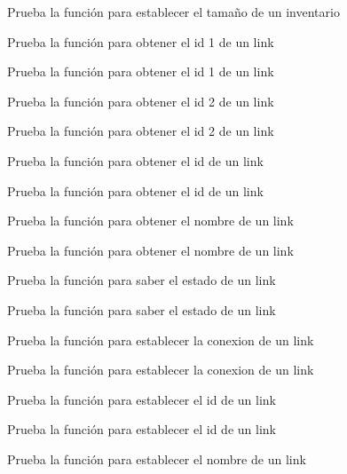 \begin{DoxyRefList}
Prueba la función para establecer el tamaño de un inventario  
\item[\label{test__test000199}%
\Hypertarget{test__test000199}%
Member \hyperlink{link__test_8h_a79d95fe7b7d20331545c527a26b18a62}{test2\+\_\+link\+\_\+get\+\_\+conection\+\_\+1} ()]Prueba la función para obtener el id 1 de un link 

Prueba la función para obtener el id 1 de un link  
\item[\label{test__test000201}%
\Hypertarget{test__test000201}%
Member \hyperlink{link__test_8h_a0a102f4a6a5fcc2026a75fb6675241d0}{test2\+\_\+link\+\_\+get\+\_\+conection\+\_\+2} ()]Prueba la función para obtener el id 2 de un link 

Prueba la función para obtener el id 2 de un link  
\item[\label{test__test000197}%
\Hypertarget{test__test000197}%
Member \hyperlink{link__test_8h_a0f967a1782dd7264e73ad428d22d125d}{test2\+\_\+link\+\_\+get\+\_\+id} ()]Prueba la función para obtener el id de un link 

Prueba la función para obtener el id de un link  
\item[\label{test__test000195}%
\Hypertarget{test__test000195}%
Member \hyperlink{link__test_8h_a4efc6cfcdc210e2803f9d285734c571e}{test2\+\_\+link\+\_\+get\+\_\+name} ()]Prueba la función para obtener el nombre de un link 

Prueba la función para obtener el nombre de un link  
\item[\label{test__test000203}%
\Hypertarget{test__test000203}%
Member \hyperlink{link__test_8h_a7d1062febd832b21e69df5f071425b4c}{test2\+\_\+link\+\_\+get\+\_\+status} ()]Prueba la función para saber el estado de un link 

Prueba la función para saber el estado de un link  
\item[\label{test__test000191}%
\Hypertarget{test__test000191}%
Member \hyperlink{link__test_8h_a1f9f58ce35b89b92b33d51e5f7a22156}{test2\+\_\+link\+\_\+set\+\_\+conection} ()]Prueba la función para establecer la conexion de un link 

Prueba la función para establecer la conexion de un link  
\item[\label{test__test000189}%
\Hypertarget{test__test000189}%
Member \hyperlink{link__test_8h_a2f107a28c71f764c8091747f48eaec3f}{test2\+\_\+link\+\_\+set\+\_\+id} ()]Prueba la función para establecer el id de un link 

Prueba la función para establecer el id de un link  
\item[\label{test__test000186}%
\Hypertarget{test__test000186}%
Member \hyperlink{link__test_8h_aa66c1e991620a5a758ba6e4d6b4a8b73}{test2\+\_\+link\+\_\+set\+\_\+name} ()]Prueba la función para establecer el nombre de un link 


\end{DoxyRefList}

